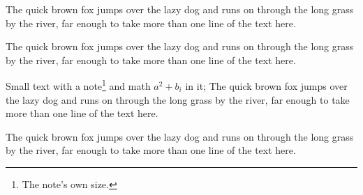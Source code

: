 \documentclass{article}
\begin{document}
The quick brown fox jumps over the lazy dog and runs on through the long grass by the river, far enough to take more than one line of the text here.

\small
The quick brown fox jumps over the lazy dog and runs on through the long grass by the river, far enough to take more than one line of the text here.

Small text with a note\footnote{The note's own size.} and math $a^2+b_i$ in it; The quick brown fox jumps over the lazy dog and runs on through the long grass by the river, far enough to take more than one line of the text here.
\vspace{2em}

\normalsize
The quick brown fox jumps over the lazy dog and runs on through the long grass by the river, far enough to take more than one line of the text here.
\end{document}
